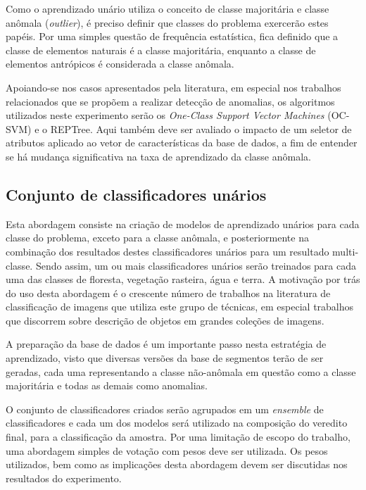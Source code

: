 Como o aprendizado unário utiliza o conceito de classe majoritária e classe anômala (\textit{outlier}), é preciso definir que classes do problema exercerão estes papéis. Por uma simples questão de frequência estatística, fica definido que a classe de elementos naturais é a classe majoritária, enquanto a classe de elementos antrópicos é considerada a classe anômala.

Apoiando-se nos casos apresentados pela literatura, em especial nos trabalhos relacionados que se propõem a realizar detecção de anomalias, os algoritmos utilizados neste experimento serão os \textit{One-Class Support Vector Machines} (OC-SVM) e o REPTree. Aqui também deve ser avaliado o impacto de um seletor de atributos aplicado ao vetor de características da base de dados, a fim de entender se há mudança significativa na taxa de aprendizado da classe anômala.

\subsection{Conjunto de classificadores unários}

Esta abordagem consiste na criação de modelos de aprendizado unários para cada classe do problema, exceto para a classe anômala, e posteriormente na combinação dos resultados destes classificadores unários para um resultado multi-classe. Sendo assim, um ou mais classificadores unários serão treinados para cada uma das classes de floresta, vegetação rasteira, água e terra. A motivação por trás do uso desta abordagem é o crescente número de trabalhos na literatura de classificação de imagens que utiliza este grupo de técnicas, em especial trabalhos que discorrem sobre descrição de objetos em grandes coleções de imagens.

A preparação da base de dados é um importante passo nesta estratégia de aprendizado, visto que diversas versões da base de segmentos terão de ser geradas, cada uma representando a classe não-anômala em questão como a classe majoritária e todas as demais como anomalias.

O conjunto de classificadores criados serão agrupados em um \textit{ensemble} de classificadores e cada um dos modelos será utilizado na composição do veredito final, para a classificação da amostra. Por uma limitação de escopo do trabalho, uma abordagem simples de votação com pesos deve ser utilizada. Os pesos utilizados, bem como as implicações desta abordagem devem ser discutidas nos resultados do experimento.

